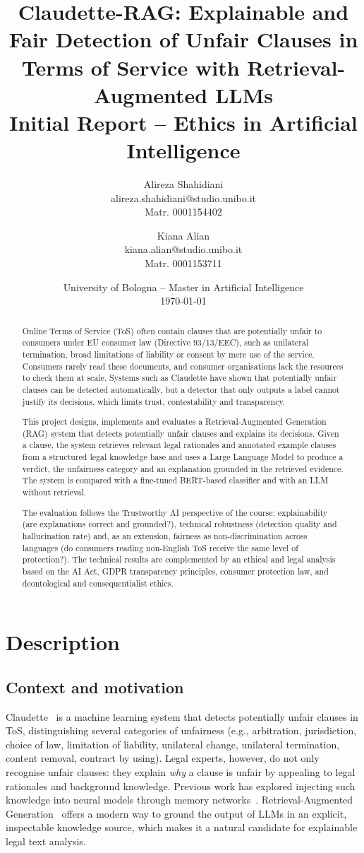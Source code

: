 \documentclass[10pt,a4paper]{article}
\title{\textbf{Claudette-RAG: Explainable and Fair Detection of Unfair Clauses in Terms of Service with Retrieval-Augmented LLMs}\\[4pt]
\large Initial Report -- Ethics in Artificial Intelligence}
\author{
\begin{tabular}{c}
Alireza Shahidiani \\
alireza.shahidiani@studio.unibo.it \\
Matr. 0001154402
\end{tabular}
\and
\begin{tabular}{c}
Kiana Alian \\
kiana.alian@studio.unibo.it \\
Matr. 0001153711
\end{tabular}
}
\date{University of Bologna -- Master in Artificial Intelligence \\ \today}
\begin{document}
\maketitle

\begin{abstract}
\noindent Online Terms of Service (ToS) often contain clauses that are potentially unfair to consumers under EU consumer law (Directive 93/13/EEC), such as unilateral termination, broad limitations of liability or consent by mere use of the service. Consumers rarely read these documents, and consumer organisations lack the resources to check them at scale. Systems such as Claudette have shown that potentially unfair clauses can be detected automatically, but a detector that only outputs a label cannot justify its decisions, which limits trust, contestability and transparency.

This project designs, implements and evaluates a Retrieval-Augmented Generation (RAG) system that detects potentially unfair clauses and explains its decisions. Given a clause, the system retrieves relevant legal rationales and annotated example clauses from a structured legal knowledge base and uses a Large Language Model to produce a verdict, the unfairness category and an explanation grounded in the retrieved evidence. The system is compared with a fine-tuned BERT-based classifier and with an LLM without retrieval.

The evaluation follows the Trustworthy AI perspective of the course: explainability (are explanations correct and grounded?), technical robustness (detection quality and hallucination rate) and, as an extension, fairness as non-discrimination across languages (do consumers reading non-English ToS receive the same level of protection?). The technical results are complemented by an ethical and legal analysis based on the AI Act, GDPR transparency principles, consumer protection law, and deontological and consequentialist ethics.
\end{abstract}

\section{Description}

\subsection{Context and motivation}
Claudette~\cite{lippi2019claudette} is a machine learning system that detects potentially unfair clauses in ToS, distinguishing several categories of unfairness (e.g., arbitration, jurisdiction, choice of law, limitation of liability, unilateral change, unilateral termination, content removal, contract by using). Legal experts, however, do not only recognise unfair clauses: they explain \emph{why} a clause is unfair by appealing to legal rationales and background knowledge. Previous work has explored injecting such knowledge into neural models through memory networks~\cite{ruggeri2022memory}. Retrieval-Augmented Generation~\cite{lewis2020rag} offers a modern way to ground the output of LLMs in an explicit, inspectable knowledge source, which makes it a natural candidate for explainable legal text analysis.
\end{document}
